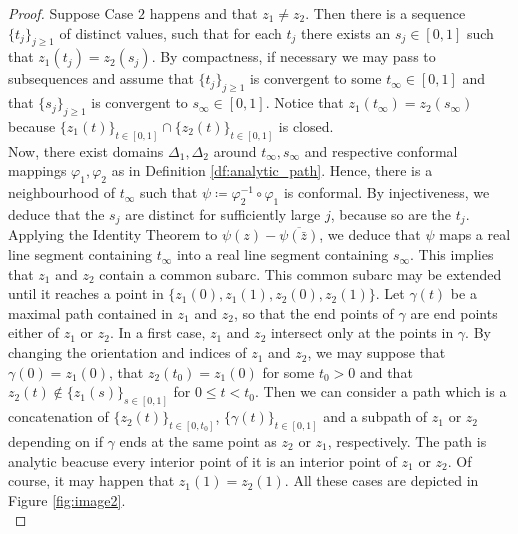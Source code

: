 \begin{proof}
Suppose Case $2$ happens and that $z_1\neq z_2$. Then there is a sequence $\{t_j\}_{j\geq 1}$ of distinct values, such that for each $t_j$ there exists an $s_j\in[0,1]$ such that $z_1(t_j) = z_2(s_j)$. By compactness, if necessary we may pass to subsequences and assume that $\{t_j\}_{j\geq 1}$ is convergent to some $t_\infty\in[0,1]$ and that $\{s_j\}_{j\geq 1}$ is convergent to $s_\infty\in[0,1]$. Notice that $z_1(t_\infty) = z_2(s_\infty)$ because $\{z_1(t)\}_{t\in[0,1]}\cap \{z_2(t)\}_{t\in[0,1]}$ is closed.\\

Now, there exist domains $\Delta_1,\Delta_2$ around $t_\infty,s_\infty$ and respective conformal mappings $\varphi_1,\varphi_2$ as in Definition \ref{df:analytic_path}. Hence, there is a neighbourhood of $t_\infty$ such that $\psi\coloneqq \varphi_2^{-1}\circ \varphi_1$ is conformal. By injectiveness, we deduce that the $s_j$ are distinct for sufficiently large $j$, because so are the $t_j$. Applying the Identity Theorem to $\psi(z)-\overline{\psi(\bar{z})}$, we deduce that $\psi$ maps a real line segment containing $t_\infty$ into a real line segment containing $s_\infty$. This implies that $z_1$ and $z_2$ contain a common subarc. This common subarc may be extended until it reaches a point in $\{z_1(0),z_1(1),z_2(0),z_2(1)\}$. Let $\gamma(t)$ be a maximal path contained in $z_1$ and $z_2$, so that the end points of $\gamma$ are end points either of $z_1$ or $z_2$. In a first case, $z_1$ and $z_2$ intersect only at the points in $\gamma$. By changing the orientation and indices of $z_1$ and $z_2$, we may suppose that $\gamma(0)=z_1(0)$, that $z_2(t_0)=z_1(0)$ for some $t_0>0$ and that $z_2(t)\not \in \{z_1(s)\}_{s\in[0,1]}$ for $0\leq t<t_0$. Then we can consider a path which is a concatenation of $\{z_2(t)\}_{t\in[0,t_0]}$, $\{\gamma(t)\}_{t\in[0,1]}$ and a subpath of $z_1$ or $z_2$ depending on if $\gamma$ ends at the same point as $z_2$ or $z_1$, respectively. The path is analytic beacuse every interior point of it is an interior point of $z_1$ or $z_2$. Of course, it may happen that $z_1(1)=z_2(1)$. All these cases are depicted in Figure \ref{fig:image2}.\\


\end{proof}

